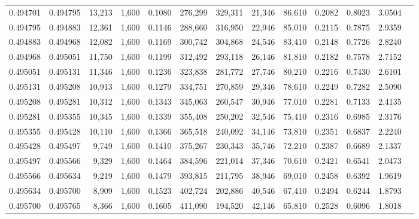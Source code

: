 \begin{tabular}{rrrrrrrrrrrrr}
0.494701 & 0.494795 & 13,213 & 1,600 &                                     0.1080 & 276,299 & 329,311 &  21,346 &  86,610 & 0.2082 & 0.8023 & 3.0504 \\
0.494795 & 0.494883 & 12,361 & 1,600 &                                     0.1146 & 288,660 & 316,950 &  22,946 &  85,010 & 0.2115 & 0.7875 & 2.9359 \\
0.494883 & 0.494968 & 12,082 & 1,600 &                                     0.1169 & 300,742 & 304,868 &  24,546 &  83,410 & 0.2148 & 0.7726 & 2.8240 \\
0.494968 & 0.495051 & 11,750 & 1,600 &                                     0.1199 & 312,492 & 293,118 &  26,146 &  81,810 & 0.2182 & 0.7578 & 2.7152 \\
0.495051 & 0.495131 & 11,346 & 1,600 &                                     0.1236 & 323,838 & 281,772 &  27,746 &  80,210 & 0.2216 & 0.7430 & 2.6101 \\
0.495131 & 0.495208 & 10,913 & 1,600 &                                     0.1279 & 334,751 & 270,859 &  29,346 &  78,610 & 0.2249 & 0.7282 & 2.5090 \\
0.495208 & 0.495281 & 10,312 & 1,600 &                                     0.1343 & 345,063 & 260,547 &  30,946 &  77,010 & 0.2281 & 0.7133 & 2.4135 \\
0.495281 & 0.495355 & 10,345 & 1,600 &                                     0.1339 & 355,408 & 250,202 &  32,546 &  75,410 & 0.2316 & 0.6985 & 2.3176 \\
0.495355 & 0.495428 & 10,110 & 1,600 &                                     0.1366 & 365,518 & 240,092 &  34,146 &  73,810 & 0.2351 & 0.6837 & 2.2240 \\
0.495428 & 0.495497 &  9,749 & 1,600 &                                     0.1410 & 375,267 & 230,343 &  35,746 &  72,210 & 0.2387 & 0.6689 & 2.1337 \\
0.495497 & 0.495566 &  9,329 & 1,600 &                                     0.1464 & 384,596 & 221,014 &  37,346 &  70,610 & 0.2421 & 0.6541 & 2.0473 \\
0.495566 & 0.495634 &  9,219 & 1,600 &                                     0.1479 & 393,815 & 211,795 &  38,946 &  69,010 & 0.2458 & 0.6392 & 1.9619 \\
0.495634 & 0.495700 &  8,909 & 1,600 &                                     0.1523 & 402,724 & 202,886 &  40,546 &  67,410 & 0.2494 & 0.6244 & 1.8793 \\
0.495700 & 0.495765 &  8,366 & 1,600 &                                     0.1605 & 411,090 & 194,520 &  42,146 &  65,810 & 0.2528 & 0.6096 & 1.8018 \\

\end{tabular}
